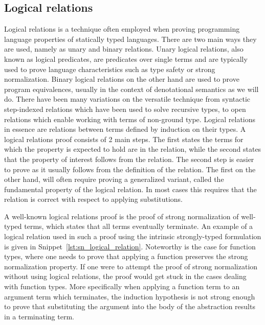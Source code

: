 \subsection{Logical relations}

Logical relations is a technique often employed when proving programming language properties of statically typed languages\cite{skorstengaard2019introduction}. There are two main ways they are used, namely as unary and binary relations.
Unary logical relations, also known as logical predicates, are predicates over single terms and are typically used to prove language characteristics such as type safety or strong normalization.
Binary logical relations on the other hand are used to prove program equivalences, usually in the context of denotational semantics as we will do.
There have been many variations on the versatile technique from syntactic step-indexed relations which have been used to solve recursive types\cite{Ahmed2006}, to open relations which enable working with terms of non-ground type\cite{barthe2020versatility}\cite{huot2020correctness}.
Logical relations in essence are relations between terms defined by induction on their types.
A logical relations proof consists of 2 main steps.
The first states the terms for which the property is expected to hold are in the relation, while the second states that the property of interest follows from the relation.
The second step is easier to prove as it usually follows from the definition of the relation. The first on the other hand, will often require proving a generalized variant, called the fundamental property of the logical relation.
In most cases this requires that the relation is correct with respect to applying substitutions.

A well-known logical relations proof is the proof of strong normalization of well-typed terms, which states that all terms eventually terminate.
An example of a logical relation used in such a proof using the intrinsic strongly-typed formulation is given in Snippet~\ref{lst:sn_logical_relation}.
Noteworthy is the case for function types, where one needs to prove that applying a function preserves the strong normalization property.
If one were to attempt the proof of strong normalization without using logical relations, the proof would get stuck in the cases dealing with function types.
More specifically when applying a function term to an argument term which terminates, the induction hypothesis is not strong enough to prove that substituting the argument into the body of the abstraction results in a terminating term.

